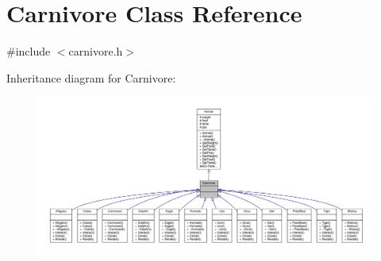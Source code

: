 \hypertarget{classCarnivore}{}\section{Carnivore Class Reference}
\label{classCarnivore}


{\ttfamily \#include $<$carnivore.\+h$>$}



Inheritance diagram for Carnivore\+:
\nopagebreak
\begin{figure}[H]
\begin{center}
\leavevmode
\includegraphics[width=350pt]{classCarnivore__inherit__graph}
\end{center}
\end{figure}


